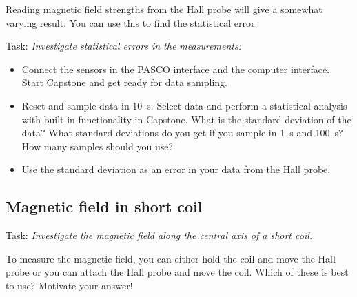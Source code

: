 \documentclass[../Elmag-labhefte-2020.tex]{subfiles}
\begin{document}
Reading magnetic field strengths from the Hall probe will give a somewhat varying result. You can use this to find the statistical error.

Task:
\emph{Investigate statistical errors in the measurements:}
\vspace{-5mm}
\begin{itemize}
    \item Connect the sensors in the PASCO interface and the computer interface. Start Capstone and get ready for data sampling.
    \item Reset and sample data in \SI{10}{\s}. Select data and perform a statistical analysis with built-in functionality in Capstone. What is the standard deviation of the data? What standard deviations do you get if you sample in \SI{1}{\s} and \SI{100}{\s}? How many samples should you use?
    \item Use the standard deviation as an error in your data from the Hall probe.
\end{itemize}

\subsection{Magnetic field in short coil}

Task:
\emph{Investigate the magnetic field along the central axis of a short coil.}
 

To measure the magnetic field, you can either hold the coil and move the Hall probe or you can attach the Hall probe and move the coil.
Which of these is best to use? Motivate your answer!
\end{document}
